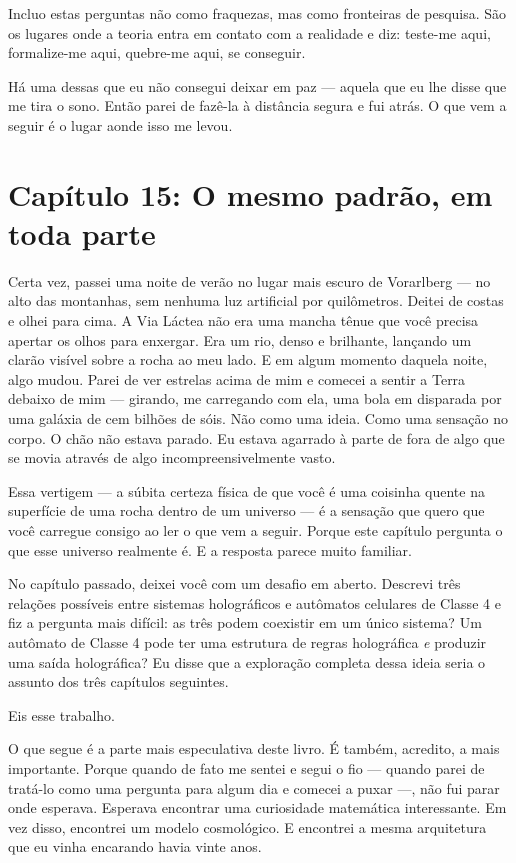 \documentclass[11pt, twoside, openright]{book}
\begin{document}
Incluo estas perguntas não como fraquezas, mas como fronteiras de pesquisa. São os lugares onde a teoria entra em contato com a realidade e diz: teste-me aqui, formalize-me aqui, quebre-me aqui, se conseguir.

Há uma dessas que eu não consegui deixar em paz --- aquela que eu lhe disse que me tira o sono. Então parei de fazê-la à distância segura e fui atrás. O que vem a seguir é o lugar aonde isso me levou.


\chapter*{Capítulo 15: O mesmo padrão, em toda parte}

Certa vez, passei uma noite de verão no lugar mais escuro de Vorarlberg --- no alto das montanhas, sem nenhuma luz artificial por quilômetros. Deitei de costas e olhei para cima. A Via Láctea não era uma mancha tênue que você precisa apertar os olhos para enxergar. Era um rio, denso e brilhante, lançando um clarão visível sobre a rocha ao meu lado. E em algum momento daquela noite, algo mudou. Parei de ver estrelas acima de mim e comecei a sentir a Terra debaixo de mim --- girando, me carregando com ela, uma bola em disparada por uma galáxia de cem bilhões de sóis. Não como uma ideia. Como uma sensação no corpo. O chão não estava parado. Eu estava agarrado à parte de fora de algo que se movia através de algo incompreensivelmente vasto.

Essa vertigem --- a súbita certeza física de que você é uma coisinha quente na superfície de uma rocha dentro de um universo --- é a sensação que quero que você carregue consigo ao ler o que vem a seguir. Porque este capítulo pergunta o que esse universo realmente é. E a resposta parece muito familiar.


No capítulo passado, deixei você com um desafio em aberto. Descrevi três relações possíveis entre sistemas holográficos e autômatos celulares de Classe 4 e fiz a pergunta mais difícil: as três podem coexistir em um único sistema? Um autômato de Classe 4 pode ter uma estrutura de regras holográfica \textit{e} produzir uma saída holográfica? Eu disse que a exploração completa dessa ideia seria o assunto dos três capítulos seguintes.

Eis esse trabalho.

O que segue é a parte mais especulativa deste livro. É também, acredito, a mais importante. Porque quando de fato me sentei e segui o fio --- quando parei de tratá-lo como uma pergunta para algum dia e comecei a puxar ---, não fui parar onde esperava. Esperava encontrar uma curiosidade matemática interessante. Em vez disso, encontrei um modelo cosmológico. E encontrei a mesma arquitetura que eu vinha encarando havia vinte anos.
\end{document}
